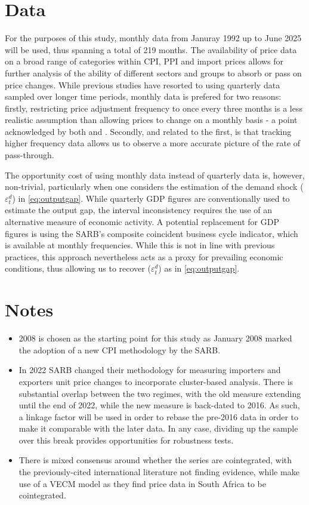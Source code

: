 \documentclass[12pt]{article}
\begin{document}
 \section*{Data}

For the purposes of this study, monthly data from Januray 1992 up to June 2025 will be used, thus spanning a total of 219 months. The availability of price data on a broad range of categories within CPI, PPI and import prices allows for further analysis of the ability of different sectors and groups to absorb or pass on price changes. While previous studies have resorted to using quarterly data sampled over longer time periods, monthly data is prefered for two reasons: firstly, restricting price adjustment frequency to once every three months is a less realistic assumption than allowing prices to change on a monthly basis -  a point acknowledged by both \textcite{mccarthy1999} and \textcite{choudhri2005explaining}. Secondly, and related to the first, is that tracking higher frequency data allows us to observe a more accurate picture of the rate of pass-through. 

The opportunity cost of using monthly data instead of quarterly data is, however, non-trivial, particularly when one considers the estimation of the demand shock ($\varepsilon_t^d$) in \ref{eq:outputgap}. While quarterly GDP figures are conventionally used to estimate the output gap, the interval inconsistency requires the use of an alternative measure of economic activity. A potential replacement for GDP figures is using the SARB's composite coincident business cycle indicator, which is available at monthly frequencies. While this is not in line with previous practices, this approach nevertheless acts as a proxy for prevailing economic conditions, thus allowing us to recover ($\varepsilon_t^d$) as in \ref{eq:outputgap}. 

\section*{Notes}
\begin{itemize}
    \item 2008 is chosen as the starting point for this study as January 2008 marked the adoption of a new CPI methodology by the SARB.
    \item In 2022 SARB changed their methodology for measuring importers and exporters unit price changes to incorporate cluster-based analysis. There is substantial overlap between the two regimes, with the old measure extending until the end of 2022, while the new measure is back-dated to 2016. As such, a linkage factor will be used in order to rebase the pre-2016 data in order to make it comparable with the later data. In any case, dividing up the sample over this break provides opportunities for robustness tests. 
    \item There is mixed consensus around whether the series are cointegrated, with the previously-cited international literature not finding evidence, while \cite{kabundi2016exchange} make use of a VECM model as they find price data in South Africa to be cointegrated.
    
\end{itemize}

\newpage
\printbibliography
\end{document}

